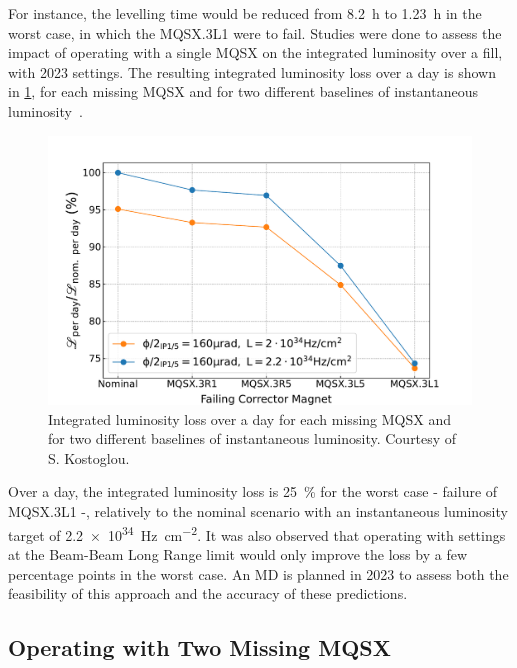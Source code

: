 For instance, the levelling time would be reduced from \qty{8.2}{\hour} to \qty{1.23}{\hour} in the worst case, in which the MQSX.\num{3}L\num{1} were to fail.
Studies were done to assess the impact of operating with a single MQSX on the integrated luminosity over a fill, with \num{2023} settings.
The resulting integrated luminosity loss over a day is shown in \cref{figure:integrated_lumi_losses}, for each missing MQSX and for two different baselines of instantaneous luminosity~\cite{MEETING:Kostoglou:Integrated_Lumi_MQSX_Carryovers}.

\begin{figure}[!htb]
    \centering
    \includegraphics*[width=\textwidth]{Figures/IR_Coupling_Correction/carry_over_integrated_lumi.pdf}
    \caption{Integrated luminosity loss over a day for each missing MQSX and for two different baselines of instantaneous luminosity. Courtesy of S. Kostoglou.}
    \label{figure:integrated_lumi_losses}
\end{figure}

Over a day, the integrated luminosity loss is \qty{25}{\percent} for the worst case - failure of MQSX.3L1 -, relatively to the nominal scenario with an instantaneous luminosity target of \qty{2.2e34}{\hertz\per\square\centi\meter}.
It was also observed that operating with settings at the Beam-Beam Long Range limit would only improve the loss by a few percentage points in the worst case.
An \gls{MD} is planned in \num{2023} to assess both the feasibility of this approach and the accuracy of these predictions.

\subsection{Operating with Two Missing MQSX}

